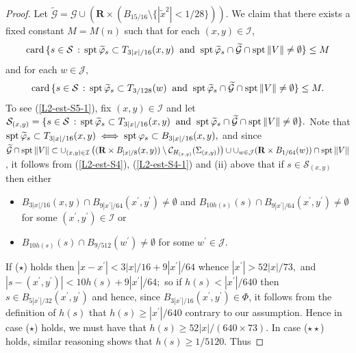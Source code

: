 \documentclass[a4paper,11pt]{amsart}
\begin{document}
\begin{proof}
Let $\widetilde{\mathcal G} = {\mathcal G} \cup \left({\mathbf R} \times (B_{15/16} \setminus \{|\widetilde{x}^{2}| < 1/28\})\right).$ We claim that there exists a fixed constant $M = M(n)$ such that 
for each $(x,y) \in {\mathcal I}$, 
\begin{equation}\label{L2-est-S5-1}
{\rm card} \, \{s \in {\mathcal S} \, : \, {\rm spt} \, \widetilde{\varphi}_{s} \subset T_{3|x|/16}(x,y) \;\; {\rm and} \;\; {\rm spt} \, \widetilde{\varphi}_{s} \cap \widetilde{\mathcal G} \cap {\rm spt} \, \|V\| \neq \emptyset\} \leq M
\end{equation}
and for each $w \in {\mathcal J}$, 
\begin{equation}\label{L2-est-S5-2}
{\rm card} \, \{s \in {\mathcal S} \, : \, {\rm spt} \, \widetilde{\varphi}_{s} \subset T_{3/128}(w) \;\; {\rm and} \;\; {\rm spt} \, \widetilde{\varphi}_{s} \cap \widetilde{\mathcal G} \cap {\rm spt} \, \|V\| \neq \emptyset\} \leq M.
\end{equation}
To see (\ref{L2-est-S5-1}), fix $(x,y) \in {\mathcal I}$ and let 
${\mathcal S}_{(x,y)} =  \{s \in {\mathcal S} \, : \, {\rm spt} \, \widetilde{\varphi}_{s} \subset T_{3|x|/16}(x,y) \;\; {\rm and} \;\; {\rm spt} \, \widetilde{\varphi}_{s} \cap \widetilde{\mathcal G} \cap {\rm spt} \, \|V\| \neq \emptyset\}.$
Note that ${\rm spt} \, \widetilde{\varphi}_{s} \subset T_{3|x|/16}(x,y) \iff {\rm spt} \, \varphi_{s} \subset B_{3|x|/16}(x,y),$ and since 
$\widetilde{\mathcal G} \cap {\rm spt} \, \|V\| \subset \cup_{(x,y) \in {\mathcal I}} \left(({\mathbf R} \times B_{|x|/8}(x,y)) \setminus {\mathcal C}_{H_{(x,y)}}(\Sigma_{(x,y)})\right) \cup \cup_{w \in {\mathcal J}} ({\mathbf R} \times B_{1/64}(w)) \cap {\rm spt} \, \|V\|$, it follows from (\ref{L2-est-S4}), (\ref{L2-est-S4-1})  and (ii) above that 
if $s \in {\mathcal S}_{(x,y)}$ then either 
\begin{itemize}
\item[($\star$)] $B_{3|x|/16}(x,y) \cap B_{9|x^{\prime}|/64}(x^{\prime}, y^{\prime}) \neq \emptyset$ and $B_{10h(s)}(s) \cap B_{9|x^{\prime}|/64}(x^{\prime},y^{\prime}) \neq \emptyset$ for some 
$(x^{\prime}, y^{\prime}) \in {\mathcal I}$ or 
\item[($\star\star$)] $B_{10h(s)}(s) \cap B_{9/512}(w^{\prime}) \neq \emptyset$ for some $w^{\prime} \in {\mathcal J}.$ 
\end{itemize} 
If ($\star$) holds then $|x - x^{\prime}| < 3|x|/16 + 9|x^{\prime}|/64$ whence $|x^{\prime}|> 52|x|/73,$ and  $|s - (x^{\prime}, y^{\prime})| < 10h(s) +  9|x^{\prime}|/64;$ so if $h(s) < |x^{\prime}|/640$ then  $s \in B_{5|x^{\prime}|/32}(x^{\prime}, y^{\prime})$ and hence, since $B_{3|x^{\prime}|/16}(x^{\prime}, y^{\prime}) \in \Phi$, it follows from the definition of $h(s)$ that $h(s) \geq |x^{\prime}|/640$ contrary to our assumption. Hence in case ($\star$) holds, we must have that $h(s) \geq 52|x|/(640 \times 73).$ In case ($\star\star$) holds, similar reasoning shows that $h(s) \geq 1/5120.$  Thus  

\end{proof}
\end{document}
